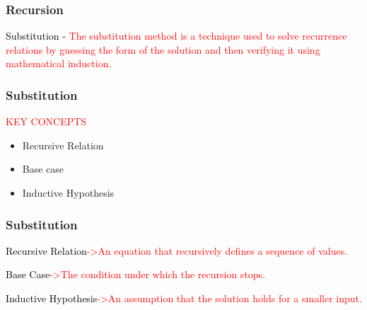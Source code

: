 \begin{frame}
    \frametitle{Recursion}
    \vspace{0.4cm} %
    \begin{block}{\textcolor{black}{Substitution - \textcolor{red}{The substitution method is a technique used to solve recurrence relations by guessing the form of the solution and then verifying it using mathematical induction.}}}
    \end{block}
    
    \vspace{0.5cm} %
\end{frame}




\begin{frame}
    \frametitle{Substitution}
    \vspace{0.4cm} %

    \begin{block}{\textcolor{red}{KEY CONCEPTS}}
    \end{block}
    \vspace{0.4cm} %

    \begin{itemize}
        \item Recursive Relation
        \vspace{0.3cm} %
        \item Base case
        \vspace{0.3cm}
        \item Inductive Hypothesis
    \end{itemize}
    
    \vspace{0.5cm} %
\end{frame}



\begin{frame}
    \frametitle{Substitution}
    \vspace{0.4cm} %
    \begin{block}{\textcolor{black}{Recursive Relation\textcolor{red}{->An equation that recursively defines a sequence of values.}}}
    \end{block}
    \vspace{0.4cm}
    \begin{block}{\textcolor{black}{Base Case\textcolor{red}{->The condition under which the recursion stops.}}}
    \end{block}
    \vspace{0.4cm}
    \begin{block}{\textcolor{black}{Inductive Hypothesis\textcolor{red}{->An assumption that the solution holds for a smaller input.}}}
    \end{block}

    \vspace{0.5cm} %
\end{frame}



